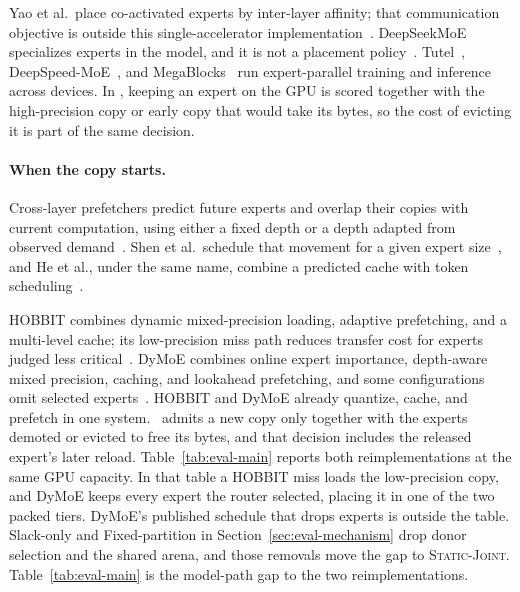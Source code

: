 Yao et al.\ place co-activated experts by inter-layer affinity; that communication objective is outside this single-accelerator implementation~\cite{yao2024exploiting}.
DeepSeekMoE specializes experts in the model, and it is not a placement policy~\cite{dai2024deepseekmoe}.
Tutel~\cite{hwang2023tutel}, DeepSpeed-MoE~\cite{rajbhandari2022deepspeed}, and MegaBlocks~\cite{gale2023megablocks} run expert-parallel training and inference across devices.
In \systemname, keeping an expert on the GPU is scored together with the high-precision copy or early copy that would take its bytes, so the cost of evicting it is part of the same decision.

\paragraph{When the copy starts.}
Cross-layer prefetchers predict future experts and overlap their copies with current computation, using either a fixed depth or a depth adapted from observed demand~\cite{song2024promoe,eliseev2023fast,hwang2024pre}.
Shen et al.\ schedule that movement for a given expert size~\cite{shen2025expertflow}, and He et al., under the same name, combine a predicted cache with token scheduling~\cite{he2024expertflow}.

HOBBIT combines dynamic mixed-precision loading, adaptive prefetching, and a multi-level cache; its low-precision miss path reduces transfer cost for experts judged less critical~\cite{tang2024hobbit}.
DyMoE combines online expert importance, depth-aware mixed precision, caching, and lookahead prefetching, and some configurations omit selected experts~\cite{huang2026dymoe}.
HOBBIT and DyMoE already quantize, cache, and prefetch in one system.
\systemname\ admits a new copy only together with the experts demoted or evicted to free its bytes, and that decision includes the released expert's later reload.
Table~\ref{tab:eval-main} reports both reimplementations at the same GPU capacity.
In that table a HOBBIT miss loads the low-precision copy, and DyMoE keeps every expert the router selected, placing it in one of the two packed tiers.
DyMoE's published schedule that drops experts is outside the table.
Slack-only and Fixed-partition in Section~\ref{sec:eval-mechanism} drop donor selection and the shared arena, and those removals move the gap to \textsc{Static-Joint}. Table~\ref{tab:eval-main} is the model-path gap to the two reimplementations.

